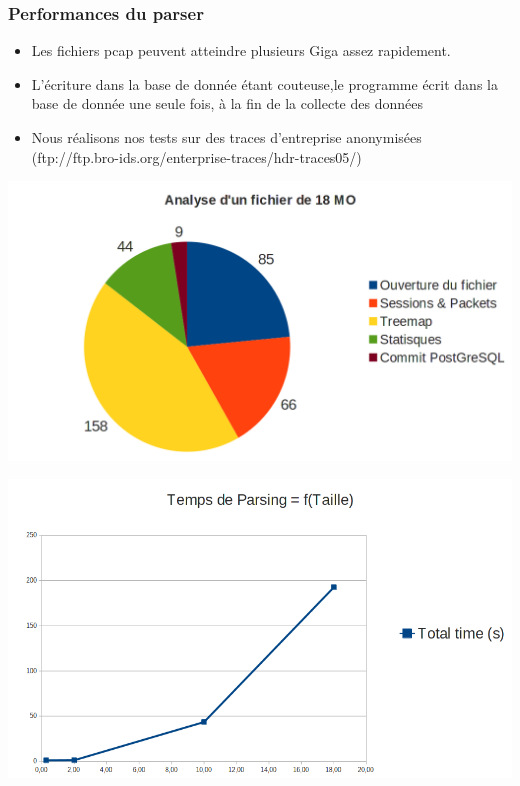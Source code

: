 \documentclass{beamer}
\begin{document}
  \begin{frame}
    \frametitle{Performances du parser}
    \begin{itemize}
     \item Les fichiers pcap peuvent atteindre plusieurs Giga assez rapidement. 
     \item L'écriture dans la base de donnée étant couteuse,le programme écrit dans la base de donnée une seule fois, à la fin de la collecte des données
     \item Nous réalisons nos tests sur des traces d'entreprise anonymisées
     (ftp://ftp.bro-ids.org/enterprise-traces/hdr-traces05/)
    \end{itemize}
  \end{frame}
  
  \begin{frame}
    \begin{center}
      \includegraphics[scale=0.3]{parse-time.png}
    \end{center} 
  \end{frame}
  
  \begin{frame}
    \begin{center}
       \includegraphics[scale=0.3]{parse-temps.png}
    \end{center} 
  \end{frame}
\end{document}
